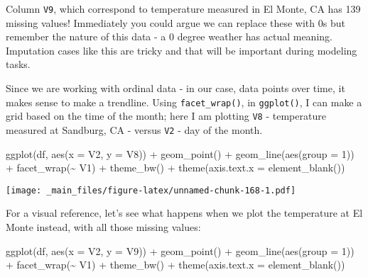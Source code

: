 \documentclass[
]{book}
\newenvironment{Shaded}{\begin{snugshade}}{\end{snugshade}}
\newcommand{\AttributeTok}[1]{\textcolor[rgb]{0.77,0.63,0.00}{#1}}
\newcommand{\DecValTok}[1]{\textcolor[rgb]{0.00,0.00,0.81}{#1}}
\newcommand{\FunctionTok}[1]{\textcolor[rgb]{0.00,0.00,0.00}{#1}}
\newcommand{\NormalTok}[1]{#1}
\newcommand{\SpecialCharTok}[1]{\textcolor[rgb]{0.00,0.00,0.00}{#1}}
\begin{document}
Column \texttt{V9}, which correspond to temperature measured in El Monte, CA has 139 missing values! Immediately you could argue we can replace these with 0s but remember the nature of this data - a 0 degree weather has actual meaning. Imputation cases like this are tricky and that will be important during modeling tasks.

Since we are working with ordinal data - in our case, data points over time, it makes sense to make a trendline. Using \texttt{facet\_wrap()}, in \texttt{ggplot()}, I can make a grid based on the time of the month; here I am plotting \texttt{V8} - temperature measured at Sandburg, CA - versus \texttt{V2} - day of the month.

\begin{Shaded}
\begin{Highlighting}[]
\FunctionTok{ggplot}\NormalTok{(df, }\FunctionTok{aes}\NormalTok{(}\AttributeTok{x =}\NormalTok{ V2, }\AttributeTok{y =}\NormalTok{ V8)) }\SpecialCharTok{+} 
  \FunctionTok{geom\_point}\NormalTok{() }\SpecialCharTok{+} \FunctionTok{geom\_line}\NormalTok{(}\FunctionTok{aes}\NormalTok{(}\AttributeTok{group =} \DecValTok{1}\NormalTok{)) }\SpecialCharTok{+}
  \FunctionTok{facet\_wrap}\NormalTok{(}\SpecialCharTok{\textasciitilde{}}\NormalTok{ V1) }\SpecialCharTok{+} \FunctionTok{theme\_bw}\NormalTok{() }\SpecialCharTok{+}
  \FunctionTok{theme}\NormalTok{(}\AttributeTok{axis.text.x =} \FunctionTok{element\_blank}\NormalTok{())}
\end{Highlighting}
\end{Shaded}

\texttt{[image: \_main\_files/figure-latex/unnamed-chunk-168-1.pdf]}

For a visual reference, let's see what happens when we plot the temperature at El Monte instead, with all those missing values:

\begin{Shaded}
\begin{Highlighting}[]
\FunctionTok{ggplot}\NormalTok{(df, }\FunctionTok{aes}\NormalTok{(}\AttributeTok{x =}\NormalTok{ V2, }\AttributeTok{y =}\NormalTok{ V9)) }\SpecialCharTok{+} 
  \FunctionTok{geom\_point}\NormalTok{() }\SpecialCharTok{+} \FunctionTok{geom\_line}\NormalTok{(}\FunctionTok{aes}\NormalTok{(}\AttributeTok{group =} \DecValTok{1}\NormalTok{)) }\SpecialCharTok{+}
  \FunctionTok{facet\_wrap}\NormalTok{(}\SpecialCharTok{\textasciitilde{}}\NormalTok{ V1) }\SpecialCharTok{+} \FunctionTok{theme\_bw}\NormalTok{() }\SpecialCharTok{+}
  \FunctionTok{theme}\NormalTok{(}\AttributeTok{axis.text.x =} \FunctionTok{element\_blank}\NormalTok{())}
\end{Highlighting}
\end{Shaded}
\end{document}
